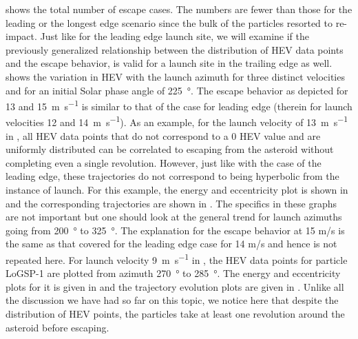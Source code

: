 \FloatBarrier
 shows the total number of escape cases. The numbers are fewer than those for the leading or the longest edge scenario since the bulk of the particles resorted to re-impact. Just like for the leading edge launch site, we will examine if the previously generalized relationship between the distribution of \gls{HEV} data points and the escape behavior, is valid for a launch site in the trailing edge as well.  shows the variation in \gls{HEV} with the launch azimuth for three distinct velocities and for an initial Solar phase angle of \SI{225}{\degree}. The escape behavior as depicted for 13 and \SI{15}{\metre\per\second} is similar to that of the case for leading edge (therein for launch velocities 12 and \SI{14}{\metre\per\second}). As an example, for the launch velocity of \SI{13}{\metre\per\second} in , all \gls{HEV} data points that do not correspond to a 0 \gls{HEV} value and are uniformly distributed can be correlated to escaping from the asteroid without completing even a single revolution. However, just like with the case of the leading edge, these trajectories do not correspond to being hyperbolic from the instance of launch. For this example, the energy and eccentricity plot is shown in  and the corresponding trajectories are shown in . The specifics in these graphs are not important but one should look at the general trend for launch azimuths going from \SI{200}{\degree} to \SI{325}{\degree}. The explanation for the escape behavior at 15 m/s is the same as that covered for the leading edge case for 14 m/s and hence is not repeated here. For launch velocity \SI{9}{\metre\per\second} in , the \gls{HEV} data points for particle LoGSP-1 are plotted from azimuth \SI{270}{\degree} to \SI{285}{\degree}. The energy and eccentricity plots for it is given in  and the trajectory evolution plots are given in . Unlike all the discussion we have had so far on this topic, we notice here that despite the distribution of \gls{HEV} points, the particles take at least one revolution around the asteroid before escaping.
